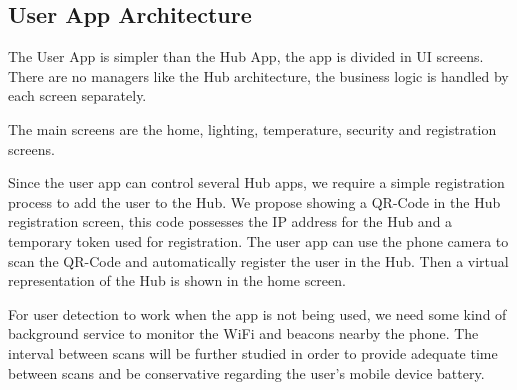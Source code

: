 \subsection{User App Architecture}
The User App is simpler than the Hub App, the app is divided in \ac{UI} screens. There are no managers like the Hub architecture, the business logic is handled by each screen separately. 


The main screens are the home, lighting, temperature, security and registration screens.

Since the user app can control several Hub apps, we require a simple registration process to add the user to the Hub. We propose showing a QR-Code in the Hub registration screen, this code possesses the \ac{IP address} for the Hub and a temporary token used for registration. The user app can use the phone camera to scan the QR-Code and automatically register the user in the Hub. Then a virtual representation of the Hub is shown in the home screen.

For user detection to work when the app is not being used, we need some kind of background service to monitor the \ac{WiFi} and beacons nearby the phone. The interval between scans will be further studied in order to provide adequate time between scans and be conservative regarding the user's mobile device battery.


